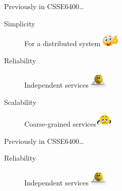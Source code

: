 \documentclass{slide}
\begin{document}






\begin{frame}{Previously in CSSE6400\dots}
    \vspace{1mm}
    {\LARGE
    \begin{description}
        \item[Simplicity] For a distributed system \tabto{15em}\includegraphics[width=8mm]{../../shared/images/thumbs-up.png}
        \item[Reliability] Independent services \tabto{15em}\includegraphics[trim=57 145 70 85,clip,width=8mm]{../../shared/images/neutral.png}
        \item[Scalability] Coarse-grained services\tabto{15em}\includegraphics[trim=22 19 22 12,clip,width=8mm]{../../shared/images/thumbs-down.png}
    \end{description}
    }
\end{frame}

\begin{frame}{Previously in CSSE6400\dots}
    \vspace{1mm}
    {\LARGE
    \begin{description}
        \item[Reliability] Independent services \tabto{15em}\includegraphics[trim=57 145 70 85,clip,width=8mm]{../../shared/images/neutral.png}
     \end{description}
    }
\end{frame}
\end{document}
